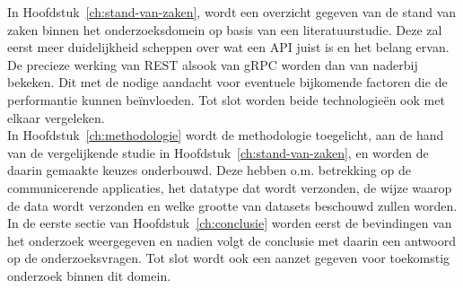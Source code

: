 In Hoofdstuk~\ref{ch:stand-van-zaken}, wordt een overzicht gegeven van de stand van zaken binnen het onderzoeksdomein op basis van een literatuurstudie.
Deze zal eerst meer duidelijkheid scheppen over wat een API juist is en het belang ervan. De precieze werking van REST alsook van gRPC
worden dan van naderbij bekeken. Dit met de nodige aandacht voor eventuele bijkomende factoren die de performantie kunnen beïnvloeden.
Tot slot worden beide technologieën ook met elkaar vergeleken.\\

In Hoofdstuk~\ref{ch:methodologie} wordt de methodologie toegelicht, aan de hand van de vergelijkende studie in Hoofdstuk~\ref{ch:stand-van-zaken}, en worden de daarin gemaakte keuzes onderbouwd.
Deze hebben o.m. betrekking op de communicerende applicaties, het datatype dat wordt verzonden, de wijze waarop de data wordt verzonden
en welke grootte van datasets beschouwd zullen worden.\\

In de eerste sectie van Hoofdstuk~\ref{ch:conclusie} worden eerst de bevindingen van het onderzoek weergegeven en nadien
volgt de conclusie met daarin een antwoord op de onderzoeksvragen.
Tot slot wordt ook een aanzet gegeven voor toekomstig onderzoek binnen dit domein.